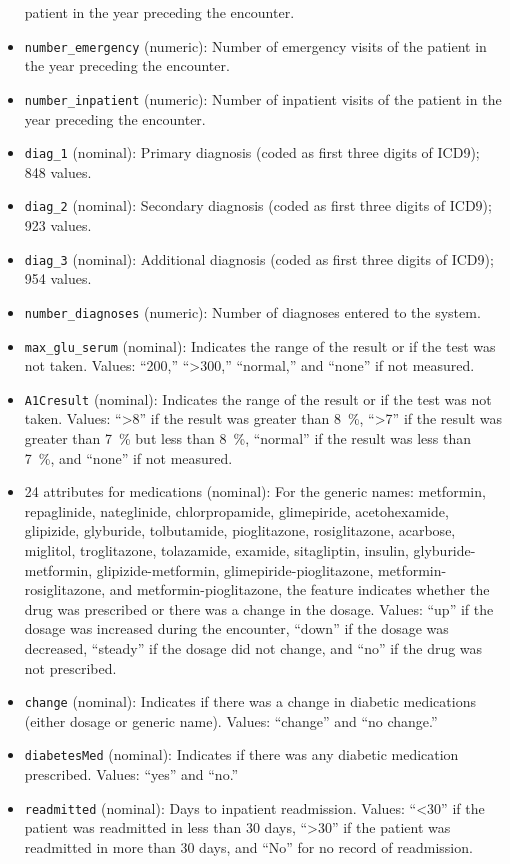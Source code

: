\documentclass{article}\usepackage[]{graphicx}\usepackage[]{color}
\begin{document}
\begin{itemize}[noitemsep]
  patient in the year preceding the encounter.
\item \texttt{number\_emergency} (numeric): Number of emergency visits of the
  patient in the year preceding the encounter.
\item \texttt{number\_inpatient} (numeric): Number of inpatient visits of the
  patient in the year preceding the encounter.
\item \texttt{diag\_1} (nominal): Primary diagnosis (coded as first three digits
  of ICD9); \num{848} values.
\item \texttt{diag\_2} (nominal): Secondary diagnosis (coded as first three
  digits of ICD9); \num{923} values.
\item \texttt{diag\_3} (nominal): Additional diagnosis (coded as first three
  digits of ICD9); \num{954} values.
\item \texttt{number\_diagnoses} (numeric): Number of diagnoses entered to the
  system.
\item \texttt{max\_glu\_serum} (nominal): Indicates the range of the result or
  if the test was not taken. Values: ``200,'' ``>300,'' ``normal,'' and ``none''
  if not measured.
\item \texttt{A1Cresult} (nominal): Indicates the range of the result or if the
  test was not taken. Values: ``>8'' if the result was greater than
  \SI{8}{\percent}, ``>7'' if the result was greater than \SI{7}{\percent} but
  less than \SI{8}{\percent}, ``normal'' if the result was less than
  \SI{7}{\percent}, and ``none'' if not measured.
\item \num{24} attributes for medications (nominal): For the generic names:
  metformin, repaglinide, nateglinide, chlorpropamide, glimepiride,
  acetohexamide, glipizide, glyburide, tolbutamide, pioglitazone, rosiglitazone,
  acarbose, miglitol, troglitazone, tolazamide, examide, sitagliptin, insulin,
  glyburide-metformin, glipizide-metformin, glimepiride-pioglitazone,
  metformin-rosiglitazone, and metformin-pioglitazone, the feature indicates
  whether the drug was prescribed or there was a change in the dosage.  Values:
  ``up'' if the dosage was increased during the encounter, ``down'' if the
  dosage was decreased, ``steady'' if the dosage did not change, and ``no'' if
  the drug was not prescribed.
\item \texttt{change} (nominal): Indicates if there was a change in diabetic
  medications (either dosage or generic name).  Values: ``change'' and ``no
  change.''
\item \texttt{diabetesMed} (nominal): Indicates if there was any diabetic
  medication prescribed.  Values: ``yes'' and ``no.''
\item \texttt{readmitted} (nominal): Days to inpatient readmission.  Values:
  ``<30'' if the patient was readmitted in less than \num{30} days, ``>30'' if
  the patient was readmitted in more than \num{30} days, and ``No'' for no
  record of readmission.
\end{itemize}
\end{document}
